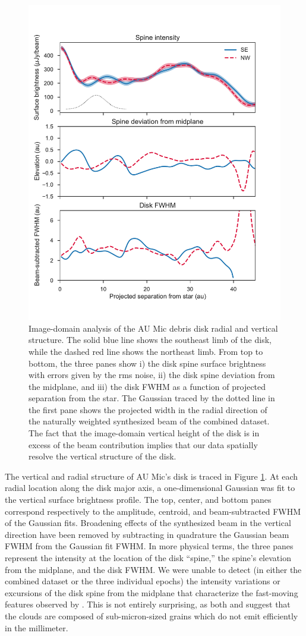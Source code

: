 \documentclass[modern]{aastex62}
\begin{document}
\begin{figure}
  \centering
  \includegraphics[width=.75\linewidth]{../figures/boccaletti_plots}
  \caption{
  Image-domain analysis of the AU Mic debris disk radial and vertical structure. 
  The solid blue line shows the southeast limb of the disk, while the dashed red line shows the northeast limb.
  From top to bottom, the three panes show i) the disk spine surface brightness with errors given by the rms noise, ii) the disk spine deviation from the midplane, and iii) the disk FWHM as a function of projected separation from the star. 
  The Gaussian traced by the dotted line in the first pane shows the projected width in the radial direction of the naturally weighted synthesized beam of the combined dataset.
  The fact that the image-domain vertical height of the disk is in excess of the beam contribution implies that our data spatially resolve the vertical structure of the disk.} 
  \label{fig: boccaletti}
\end{figure}

The vertical and radial structure of AU Mic's disk is traced in Figure \ref{fig: boccaletti}. 
At each radial location along the disk major axis, a one-dimensional Gaussian was fit to the vertical surface brightness profile.
The top, center, and bottom panes correspond respectively to the amplitude, centroid, and beam-subtracted FWHM of the Gaussian fits. 
Broadening effects of the synthesized beam in the vertical direction have been removed by subtracting in quadrature the Gaussian beam FWHM from the Gaussian fit FWHM.
In more physical terms, the three panes represent the intensity at the location of the disk ``spine,'' the spine's elevation from the midplane, and the disk FWHM.
We were unable to detect (in either the combined dataset or the three individual epochs) the intensity variations or excursions of the disk spine from the midplane that characterize the fast-moving features observed by \cite{boccaletti15}.
This is not entirely surprising, as both \cite{sezestre17} and \cite{chiang&fung17} suggest that the clouds are composed of sub-micron-sized grains which do not emit efficiently in the millimeter.
\end{document}
